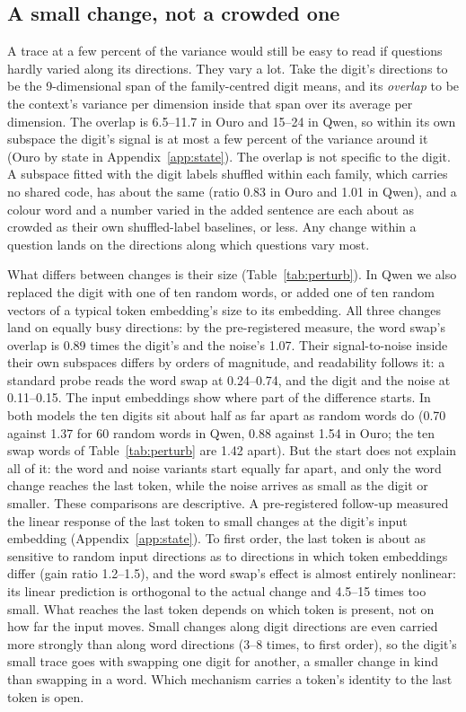 \documentclass{article}
\begin{document}
\subsection{A small change, not a crowded one}\label{sec:swamp}

A trace at a few percent of the variance would still be easy to read if questions hardly varied along its directions. They vary a lot. Take the digit's directions to be the 9-dimensional span of the family-centred digit means, and its \emph{overlap} to be the context's variance per dimension inside that span over its average per dimension. The overlap is 6.5--11.7 in Ouro and 15--24 in Qwen, so within its own subspace the digit's signal is at most a few percent of the variance around it (Ouro by state in Appendix~\ref{app:state}). The overlap is not specific to the digit. A subspace fitted with the digit labels shuffled within each family, which carries no shared code, has about the same (ratio 0.83 in Ouro and 1.01 in Qwen), and a colour word and a number varied in the added sentence are each about as crowded as their own shuffled-label baselines, or less. Any change within a question lands on the directions along which questions vary most.

What differs between changes is their size (Table~\ref{tab:perturb}). In Qwen we also replaced the digit with one of ten random words, or added one of ten random vectors of a typical token embedding's size to its embedding. All three changes land on equally busy directions: by the pre-registered measure, the word swap's overlap is 0.89 times the digit's and the noise's 1.07. Their signal-to-noise inside their own subspaces differs by orders of magnitude, and readability follows it: a standard probe reads the word swap at 0.24--0.74, and the digit and the noise at 0.11--0.15. The input embeddings show where part of the difference starts. In both models the ten digits sit about half as far apart as random words do (0.70 against 1.37 for 60 random words in Qwen, 0.88 against 1.54 in Ouro; the ten swap words of Table~\ref{tab:perturb} are 1.42 apart). But the start does not explain all of it: the word and noise variants start equally far apart, and only the word change reaches the last token, while the noise arrives as small as the digit or smaller. These comparisons are descriptive. A pre-registered follow-up measured the linear response of the last token to small changes at the digit's input embedding (Appendix~\ref{app:state}). To first order, the last token is about as sensitive to random input directions as to directions in which token embeddings differ (gain ratio 1.2--1.5), and the word swap's effect is almost entirely nonlinear: its linear prediction is orthogonal to the actual change and 4.5--15 times too small. What reaches the last token depends on which token is present, not on how far the input moves. Small changes along digit directions are even carried more strongly than along word directions (3--8 times, to first order), so the digit's small trace goes with swapping one digit for another, a smaller change in kind than swapping in a word. Which mechanism carries a token's identity to the last token is open.
\end{document}
